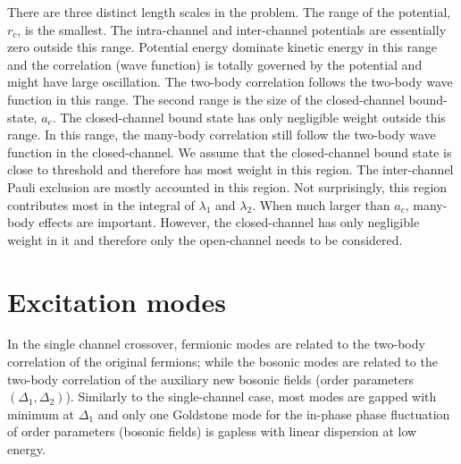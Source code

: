 There are three distinct length scales in the problem.  The range of the potential, $r_c$, is the smallest.  The intra-channel and inter-channel potentials are  essentially zero outside this range. Potential energy dominate kinetic energy in this range and the correlation (wave function) is totally governed by the potential and might have large oscillation.   The two-body correlation follows the two-body wave function in this range.  The second range is the size of the closed-channel bound-state, $a_c$.  The closed-channel bound state  has only negligible weight outside this range.  In this range, the many-body correlation still follow the two-body wave function in the closed-channel.  We assume that  the closed-channel bound state is close to threshold  and therefore has most weight in this region.  The inter-channel Pauli exclusion are mostly accounted in this  region.  Not surprisingly, this region contributes most in the integral of $\lambda_{1}$ and $\lambda_{2}$. When much larger than $a_c$, many-body effects are important. However, the closed-channel has only negligible weight in it and therefore only the open-channel needs to be considered.  



%

\chapter{Excitation modes\label{ch:excitation}}
In the single channel crossover, fermionic modes are related to the two-body correlation of the original fermions; while the bosonic modes are related to the two-body correlation of the auxiliary new bosonic fields (order parameters $(\Delta_{1}, \Delta_{2})$).  Similarly to the single-channel case, most modes are gapped with minimum at  $\Delta_{1}$ and only one  Goldstone mode for the in-phase phase fluctuation of order parameters (bosonic fields) is gapless with linear dispersion at low energy. 

